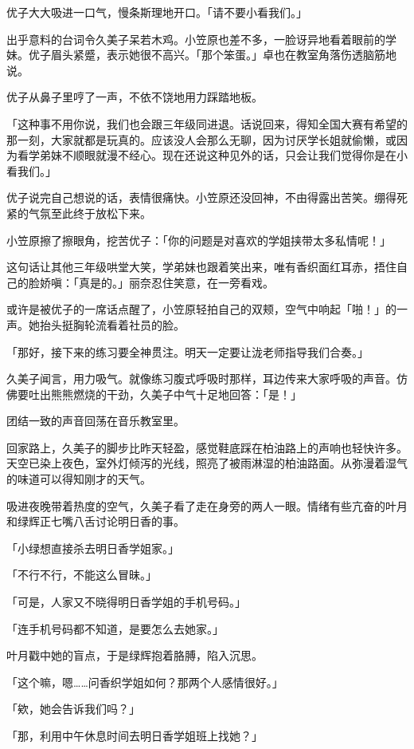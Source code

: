 \documentclass[UTF8]{ctexart}
\begin{document}
    优子大大吸进一口气，慢条斯理地开口。「请不要小看我们。」 

    出乎意料的台词令久美子呆若木鸡。小笠原也差不多，一脸讶异地看着眼前的学妹。优子眉头紧蹙，表示她很不高兴。「那个笨蛋。」卓也在教室角落伤透脑筋地说。 

    优子从鼻子里哼了一声，不依不饶地用力踩踏地板。 

    「这种事不用你说，我们也会跟三年级同进退。话说回来，得知全国大赛有希望的那一刻，大家就都是玩真的。应该没人会那么无聊，因为讨厌学长姐就偷懒，或因为看学弟妹不顺眼就漫不经心。现在还说这种见外的话，只会让我们觉得你是在小看我们。」 

    优子说完自己想说的话，表情很痛快。小笠原还没回神，不由得露出苦笑。绷得死紧的气氛至此终于放松下来。 

    小笠原擦了擦眼角，挖苦优子：「你的问题是对喜欢的学姐挟带太多私情呢！」 

    这句话让其他三年级哄堂大笑，学弟妹也跟着笑出来，唯有香织面红耳赤，捂住自己的脸娇嗔：「真是的。」丽奈忍住笑意，在一旁看戏。 

    或许是被优子的一席话点醒了，小笠原轻拍自己的双颊，空气中响起「啪！」的一声。她抬头挺胸轮流看着社员的脸。 

    「那好，接下来的练习要全神贯注。明天一定要让泷老师指导我们合奏。」 

    久美子闻言，用力吸气。就像练习腹式呼吸时那样，耳边传来大家呼吸的声音。仿佛要吐出熊熊燃烧的干劲，久美子中气十足地回答：「是！」 

    团结一致的声音回荡在音乐教室里。 

    回家路上，久美子的脚步比昨天轻盈，感觉鞋底踩在柏油路上的声响也轻快许多。天空已染上夜色，室外灯倾泻的光线，照亮了被雨淋湿的柏油路面。从弥漫着湿气的味道可以得知刚才的天气。 

    吸进夜晚带着热度的空气，久美子看了走在身旁的两人一眼。情绪有些亢奋的叶月和绿辉正七嘴八舌讨论明日香的事。 

    「小绿想直接杀去明日香学姐家。」 

    「不行不行，不能这么冒昧。」 

    「可是，人家又不晓得明日香学姐的手机号码。」 

    「连手机号码都不知道，是要怎么去她家。」 

    叶月戳中她的盲点，于是绿辉抱着胳膊，陷入沉思。 

    「这个嘛，嗯……问香织学姐如何？那两个人感情很好。」 

    「欸，她会告诉我们吗？」 

    「那，利用中午休息时间去明日香学姐班上找她？」 
\end{document}
